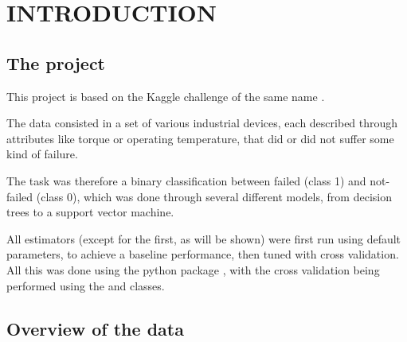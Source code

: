 \section{INTRODUCTION}
\begin{frame}{\secname}
\end{frame}

\subsection{The project}
\begin{frame}{\subsecname}
This project is based on the Kaggle challenge of the same name \cite{playground-series-s3e17}.

The data consisted in a set of various industrial devices, each described through attributes like torque or operating temperature, that did or did not suffer some kind of failure.

The task was therefore a binary classification between failed (class 1) and not-failed (class 0), which was done through several different models, from decision trees to a support vector machine.

All estimators (except for the first, as will be shown) were first run using default parameters, to achieve a baseline performance, then tuned with cross validation. All this was done using the  python package \cite{scikit-learn}, with the cross validation being performed using the  and  classes.
\end{frame}

\subsection{Overview of the data}

